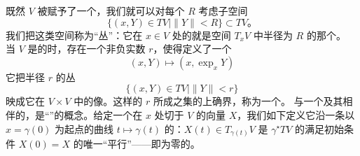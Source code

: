 既然 $V$ 被赋予了一个\trRiemann\trMetric，我们就可以对每个 $R$ 考虑子空间
\[
\bigl\{(x,Y)\in TV\mid\|Y\|<R\bigr\}\subset TV\text{。}
\]
我们把这类空间称为“\trDisk{}丛”：它在 $x\in V$ 处的\trFiber{}就是\trEuclidean{}空间 $T_{x}V$ 中半径为 $R$ 的那个\trDisk。
当\trManifold{} $V$ 是\trCompact{}的时，存在一个非负实数 $r$，使得\trExponentialMap{}定义了一个\trDiffeomorphism
\[
(x,Y)\longmapsto(x,\exp_{x}Y)
\]
它把半径 $r$ 的\trDisk{}丛
\[
\bigl\{(x,Y)\in TV\mid\|Y\|<r\bigr\}
\]
映成它在 $V\times V$ 中的像。这样的 $r$ 所成之集的上确界，称为一个\trInjectivityRadius。
与一个\trRiemann\trMetric{}及其\trLeviCivita{}\trConnection{}相伴的，是“\trParallelTransport”的概念。给定一个在 $x$ 处切于 $V$ 的向量 $X$，我们如下定义它沿一条以 $x=\gamma(0)$ 为起点的曲线 $t\mapsto\gamma(t)$ 的\trParallelTransport：$X(t)\in T_{\gamma(t)}V$ 是 $\gamma^{\star}TV$ 的满足初始条件 $X(0)=X$ 的唯一“平行”\trSection{}——即\trCovariantDerivative{}为零的\trSection。
